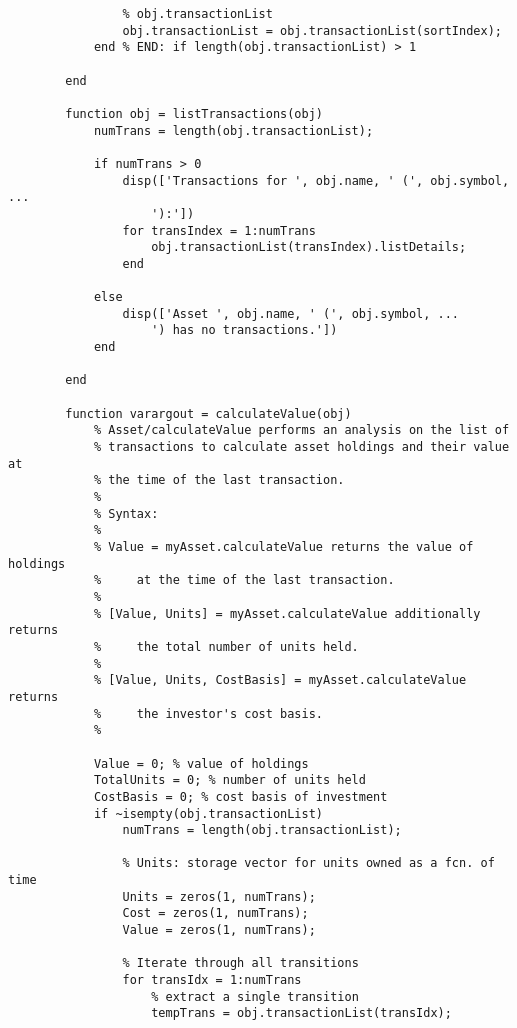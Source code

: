 \begin{lstlisting}[style=Matlab-editor, caption={The \texttt{Asset} class with a new \texttt{calculateValue()} method.}, label={lst:AssetValueCalculation}]
                % reorder the unsorted transactions and store in
                % obj.transactionList
                obj.transactionList = obj.transactionList(sortIndex);
            end % END: if length(obj.transactionList) > 1
                
        end
        
        function obj = listTransactions(obj)
            numTrans = length(obj.transactionList);
            
            if numTrans > 0
                disp(['Transactions for ', obj.name, ' (', obj.symbol, ...
                    '):'])
                for transIndex = 1:numTrans
                    obj.transactionList(transIndex).listDetails;
                end
                
            else
                disp(['Asset ', obj.name, ' (', obj.symbol, ...
                    ') has no transactions.'])
            end
            
        end

        function varargout = calculateValue(obj)
            % Asset/calculateValue performs an analysis on the list of
            % transactions to calculate asset holdings and their value at
            % the time of the last transaction.
            % 
            % Syntax:
            %
            % Value = myAsset.calculateValue returns the value of holdings
            %     at the time of the last transaction.
            %
            % [Value, Units] = myAsset.calculateValue additionally returns
            %     the total number of units held.
            %
            % [Value, Units, CostBasis] = myAsset.calculateValue returns
            %     the investor's cost basis.
            %
            
            Value = 0; % value of holdings
            TotalUnits = 0; % number of units held
            CostBasis = 0; % cost basis of investment
            if ~isempty(obj.transactionList)
                numTrans = length(obj.transactionList);
                
                % Units: storage vector for units owned as a fcn. of time
                Units = zeros(1, numTrans);
                Cost = zeros(1, numTrans);
                Value = zeros(1, numTrans);
                
                % Iterate through all transitions
                for transIdx = 1:numTrans
                    % extract a single transition
                    tempTrans = obj.transactionList(transIdx);
                    

\end{lstlisting}

